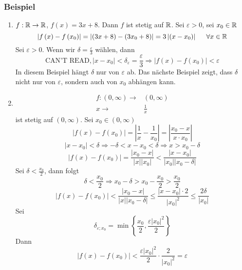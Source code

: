 \subsubsection*{Beispiel}
\begin{enumerate}
\item $f:\mathbb{R}\to\mathbb{R}$, $f(x)=3x+8$. Dann $f$ ist stetig auf $\mathbb{R}$. Sei $\varepsilon>0$, sei $x_0\in\mathbb{R}$
\[\left| {f\left( x \right) - f\left( {{x_0}} \right)} \right| = \left| {\left( {3x + 8} \right) - \left( {3{x_0} + 8} \right)} \right| = 3\left| {\left( {x - {x_0}} \right)} \right|\hspace{5mm}\forall x \in \mathbb{R}\]
Sei $\varepsilon>0$. Wenn wir $\delta=\frac{\varepsilon}{3}$ wählen, dann
\[ \text{CAN'T READ}, \left| {x - {x_0}} \right| < {\delta _\varepsilon } = \frac{\varepsilon }{3} \Rightarrow \left| {f\left( x \right) - f\left( {{x_0}} \right)} \right| < \varepsilon \]
In diesem Beispiel hängt $\delta$ nur von $\varepsilon$ ab. Das nächste Beispiel zeigt, dass $\delta$ nicht nur von $\varepsilon$, sondern auch von $x_0$ abhängen kann.
\item \begin{align*}
f:\left( 0,\infty\right)\to&\left( 0,\infty\right)\\
x\to&\frac{1}{x}
\end{align*}
ist stetig auf $\left( 0,\infty\right)$. Sei $x_0\in\left( 0,\infty\right)$
\[\left| {f\left( x \right) - f\left( {{x_0}} \right)} \right| = \left| {\frac{1}{x} - \frac{1}{{{x_0}}}} \right| = \left| {\frac{{{x_0} - x}}{{x \cdot {x_0}}}} \right|\]
\[\left| {x - {x_0}} \right| < \delta  \Rightarrow  - \delta  < x - {x_0} < \delta  \Rightarrow x > {x_0} - \delta \]
\[\left| {f\left( x \right) - f\left( {{x_0}} \right)} \right| = \frac{{\left| {{x_0} - x} \right|}}{{\left| x \right|\left| {{x_0}} \right|}} < \frac{{\left| {x - {x_0}} \right|}}{{\left| {{x_0}} \right|\left| {{x_0} - \delta } \right|}}\]
Sei $\delta<\frac{x_0}{2}$, dann folgt
\[\delta  < \frac{{{x_0}}}{2} \Rightarrow {x_0} - \delta  > {x_0} - \frac{{{x_0}}}{2} > \frac{{{x_0}}}{2}\]
\[\left| {f\left( x \right) - f\left( {{x_0}} \right)} \right| < \frac{{\left| {{x_0} - x} \right|}}{{\left| x \right|\left| {{x_0} - \delta } \right|}} \le \frac{{\left| {x - {x_0}} \right| \cdot 2}}{{{{\left| {{x_0}} \right|}^2}}} \le \frac{{2\delta }}{{\left| {{x_0}} \right|}}\]
Sei
\[{\delta _{\varepsilon ;{x_0}}} = \min \left\{ {\frac{{{x_0}}}{2},\frac{{\varepsilon {{\left| {{x_0}} \right|}^2}}}{2}} \right\}\]
Dann
\[\left| {f\left( x \right) - f\left( {{x_0}} \right)} \right| < \frac{{\varepsilon {{\left| {{x_0}} \right|}^2}}}{2} \cdot \frac{2}{{{{\left| {{x_0}} \right|}^2}}} = \varepsilon \]
\end{enumerate}

